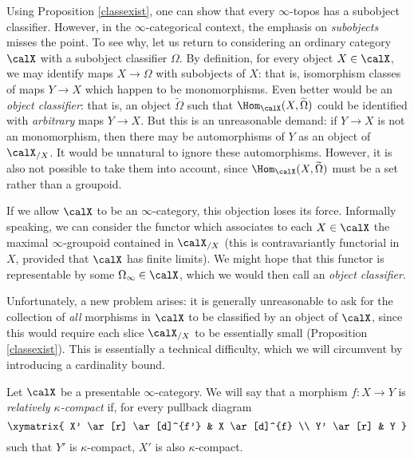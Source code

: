 Using Proposition \ref{classexist}, one can show that every $\infty$-topos has a subobject classifier. However, in the $\infty$-categorical context, the emphasis on {\em subobjects} misses the point. To see why, let us return to considering an ordinary category $\calX$ with a subobject classifier $\Omega$. By definition, for every object $X \in \calX$, we may identify maps $X \rightarrow \Omega$ with subobjects of $X$: that is, isomorphism classes of maps $Y \rightarrow X$ which happen to be monomorphisms. Even better would be an {\it object classifier}: that is, an object $\widetilde{\Omega}$ such that $\Hom_{\calX}(X, \widetilde{\Omega})$ could be identified with {\em arbitrary} maps $Y \rightarrow X$. But this is an unreasonable demand: if $Y \rightarrow X$ is not an monomorphism, then there may be automorphisms of $Y$ as an object of $\calX_{/X}$. It would be unnatural to ignore these automorphisms. However, it is also not possible to take them into account, since $\Hom_{\calX}(X, \widetilde{\Omega})$ must be a set rather than a groupoid.

If we allow $\calX$ to be an $\infty$-category, this objection loses its force. Informally speaking, we can consider the functor which associates to each $X \in \calX$ the maximal $\infty$-groupoid contained in $\calX_{/X}$ (this is contravariantly functorial in $X$, provided that $\calX$ has finite limits). We might hope that this functor is representable by some $\Omega_{\infty} \in \calX$, which we would then call an {\it object classifier}.

Unfortunately, a new problem arises: it is generally unreasonable to ask for the collection of {\em all} morphisms in $\calX$ to be classified by an object of $\calX$, since this would require each slice $\calX_{/X}$ to be essentially small (Proposition \ref{classexist}). This is essentially a technical difficulty, which we will circumvent by introducing a cardinality bound.

\begin{definition}
Let $\calX$ be a presentable $\infty$-category. We will say that a morphism
$f: X \rightarrow Y$ is {\it relatively $\kappa$-compact} if, for every pullback diagram
$$ \xymatrix{ X' \ar[r] \ar[d]^{f'} & X \ar[d]^{f} \\
Y' \ar[r] & Y }$$
such that $Y'$ is $\kappa$-compact, $X'$ is also $\kappa$-compact.
\end{definition}

